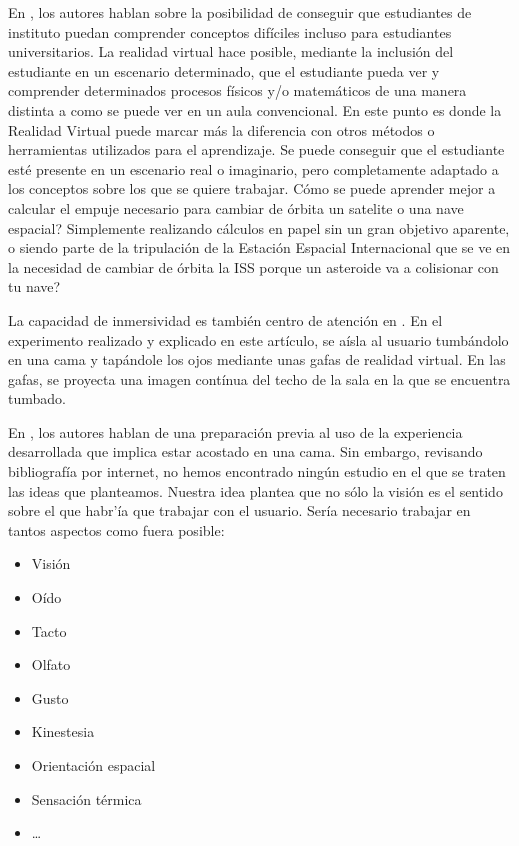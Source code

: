 \documentclass[twoside,twocolumn]{article}
\begin{document}
En \cite{ScienceSpace}, los autores hablan sobre la posibilidad de conseguir que estudiantes de instituto puedan comprender conceptos dif\'iciles incluso para estudiantes universitarios. La realidad virtual hace posible, mediante la inclusi\'on del estudiante en un escenario determinado, que el estudiante pueda ver y comprender determinados procesos f\'isicos y/o matem\'aticos de una manera distinta a como se puede ver en un aula convencional. En este punto es donde la Realidad Virtual puede marcar m\'as la diferencia con otros m\'etodos o herramientas utilizados para el aprendizaje. Se puede conseguir que el estudiante est\'e presente en un escenario real o imaginario, pero completamente adaptado a los conceptos sobre los que se quiere trabajar. C\'omo se puede aprender mejor a calcular el empuje necesario para cambiar de \'orbita un satelite o una nave espacial? Simplemente realizando c\'alculos en papel sin un gran objetivo aparente, o siendo parte de la tripulaci\'on de la Estaci\'on Espacial Internacional que se ve en la necesidad de cambiar de \'orbita la ISS porque un asteroide va a colisionar con tu nave?

La capacidad de inmersividad es tambi\'en centro de atenci\'on en \cite{Presence}. En el experimento realizado y explicado en este art\'i­culo, se a\'isla al usuario tumb\'andolo en una cama y tap\'andole los ojos mediante unas gafas de realidad virtual. En las gafas, se proyecta una imagen cont\'inua del techo de la sala en la que se encuentra tumbado.

En \cite{Presence}, los autores hablan de una preparaci\'on previa al uso de la experiencia desarrollada que implica estar acostado en una cama. Sin embargo, revisando bibliograf\'i­a por internet, no hemos encontrado ning\'un estudio en el que se traten las ideas que planteamos. Nuestra idea plantea que no s\'olo la visi\'on es el sentido sobre el que habr'\'ia que trabajar con el usuario. Ser\'ia necesario trabajar en tantos aspectos como fuera posible:

\begin{itemize}
\item Visi\'on
\item O\'ido
\item Tacto
\item Olfato
\item Gusto
\item Kinestesia
\item Orientaci\'on espacial
\item Sensaci\'on t\'ermica
\item \ldots
\end{itemize}
\end{document}
